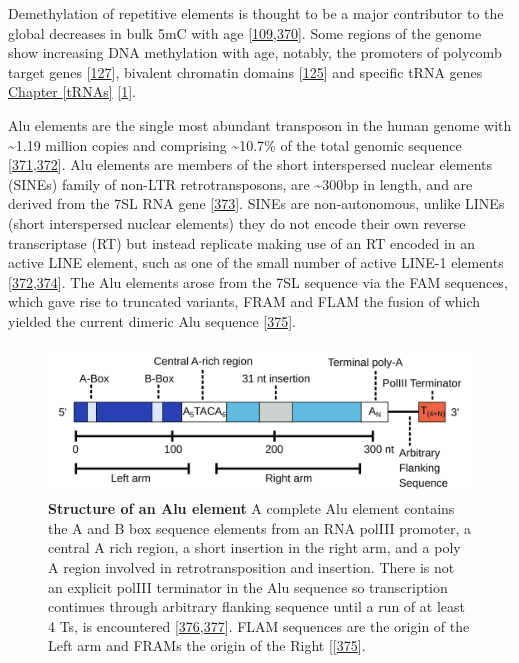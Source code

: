 \documentclass[
]{book}
\begin{document}
Demethylation of repetitive elements is thought to be a major contributor to the global decreases in bulk 5mC with age {[}\protect\hyperlink{ref-Wilson1983}{109},\protect\hyperlink{ref-Bollati2010}{370}{]}.
Some regions of the genome show increasing DNA methylation with age, notably, the promoters of polycomb target genes {[}\protect\hyperlink{ref-Teschendorff2010}{127}{]}, bivalent chromatin domains {[}\protect\hyperlink{ref-Rakyan2010}{125}{]} and specific tRNA genes \protect\hyperlink{tRNAs}{Chapter \ref{tRNAs}} {[}\protect\hyperlink{ref-Acton2020}{1}{]}.

Alu elements are the single most abundant transposon in the human genome with \textasciitilde1.19 million copies and comprising \textasciitilde10.7\% of the total genomic sequence {[}\protect\hyperlink{ref-Dewannieux2003}{371},\protect\hyperlink{ref-Deininger2011}{372}{]}.
Alu elements are members of the short interspersed nuclear elements (SINEs) family of non-LTR retrotransposons, are \textasciitilde300bp in length, and are derived from the 7SL RNA gene {[}\protect\hyperlink{ref-Ullu1984}{373}{]}.
SINEs are non-autonomous, unlike LINEs (short interspersed nuclear elements) they do not encode their own reverse transcriptase (RT) but instead replicate making use of an RT encoded in an active LINE element, such as one of the small number of active LINE-1 elements {[}\protect\hyperlink{ref-Deininger2011}{372},\protect\hyperlink{ref-Cordaux2009}{374}{]}.
The Alu elements arose from the 7SL sequence via the FAM sequences, which gave rise to truncated variants, FRAM and FLAM the fusion of which yielded the current dimeric Alu sequence {[}\protect\hyperlink{ref-Quentin1992}{375}{]}.

\begin{figure}

{\centering \includegraphics[width=0.9\linewidth]{./figs/AluStructure} 

}

\caption{\textbf{Structure of an Alu element} A complete Alu element contains the A and B box sequence elements from an RNA polIII promoter, a central A rich region, a short insertion in the right arm, and a poly A region involved in retrotransposition and insertion. There is not an explicit polIII terminator in the Alu sequence so transcription continues through arbitrary flanking sequence until a run of at least 4 Ts, is encountered {[}\protect\hyperlink{ref-Chen2008}{376},\protect\hyperlink{ref-Batzer2002}{377}{]}. FLAM sequences are the origin of the Left arm and FRAMs the origin of the Right {[}{[}\protect\hyperlink{ref-Quentin1992}{375}{]}.}\label{fig:AluStruct}
\end{figure}
\end{document}
